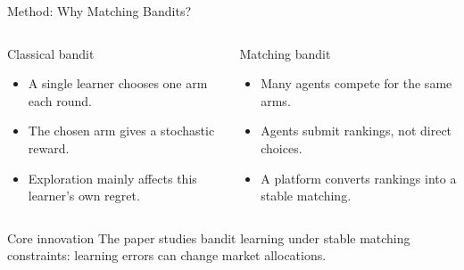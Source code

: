 \documentclass[aspectratio=169,11pt]{beamer}
\begin{document}
\begin{frame}{Method: Why Matching Bandits?}
  \begin{columns}[T,onlytextwidth]
    \begin{block}{Classical bandit}
      \begin{itemize}
        \item A single learner chooses one arm each round.
        \item The chosen arm gives a stochastic reward.
        \item Exploration mainly affects this learner's own regret.
      \end{itemize}
    \end{block}

    \begin{block}{Matching bandit}
      \begin{itemize}
        \item Many agents compete for the same arms.
        \item Agents submit rankings, not direct choices.
        \item A platform converts rankings into a stable matching.
      \end{itemize}
    \end{block}
  \end{columns}

  \vspace{0.25cm}
  \begin{block}{Core innovation}
    \centering
    The paper studies bandit learning under stable matching constraints: learning errors can change market allocations.
  \end{block}
\end{frame}
\end{document}

